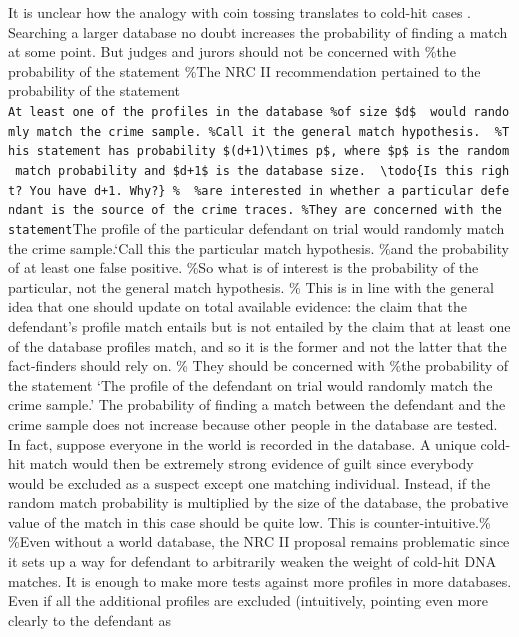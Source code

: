 \documentclass[10pt,dvipsnames,enabledeprecatedfontcommands]{scrartcl}
\begin{document}
It is unclear how the analogy with coin tossing translates to cold-hit
cases \citep{donnelly1999DNADatabaseSearches}. Searching a larger
database no doubt increases the probability of finding a match at some
point. But judges and jurors should not be concerned with \%the
probability of the statement \%The NRC II recommendation pertained to
the probability of the statement
\texttt{At\ least\ one\ of\ the\ profiles\ in\ the\ database\ \%of\ size\ \$d\$\ \ would\ randomly\ match\ the\ crime\ sample.\textquotesingle{}\ \%Call\ it\ the\ general\ match\ hypothesis.\ \ \%This\ statement\ has\ probability\ \$(d+1)\textbackslash{}times\ p\$,\ where\ \$p\$\ is\ the\ random\ match\ probability\ and\ \$d+1\$\ is\ the\ database\ size.\ \ \textbackslash{}todo\{Is\ this\ right?\ You\ have\ d+1.\ Why?\}\ \%\ \ \%are\ interested\ in\ whether\ a\ particular\ defendant\ is\ the\ source\ of\ the\ crime\ traces.\ \%They\ are\ concerned\ with\ the\ statement}The
profile of the particular defendant on trial would randomly match the
crime sample.`Call this the particular match hypothesis. \%and the
probability of at least one false positive. \%So what is of interest is
the probability of the particular, not the general match hypothesis. \%
This is in line with the general idea that one should update on total
available evidence: the claim that the defendant's profile match entails
but is not entailed by the claim that at least one of the database
profiles match, and so it is the former and not the latter that the
fact-finders should rely on. \% They should be concerned with \%the
probability of the statement `The profile of the defendant on trial
would randomly match the crime sample.' The probability of finding a
match between the defendant and the crime sample does not increase
because other people in the database are tested. In fact, suppose
everyone in the world is recorded in the database. A unique cold-hit
match would then be extremely strong evidence of guilt since everybody
would be excluded as a suspect except one matching individual. Instead,
if the random match probability is multiplied by the size of the
database, the probative value of the match in this case should be quite
low. This is counter-intuitive.\%\\
\%Even without a world database, the NRC II proposal remains problematic
since it sets up a way for defendant to arbitrarily weaken the weight of
cold-hit DNA matches. It is enough to make more tests against more
profiles in more databases. Even if all the additional profiles are
excluded (intuitively, pointing even more clearly to the defendant as
\end{document}
